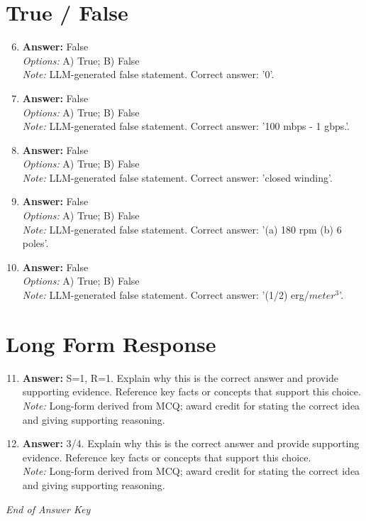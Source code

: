 \documentclass[12pt]{article}
\begin{document}
\section*{True / False}
\begin{enumerate}[label=\arabic*.]
\setcounter{enumi}{5}
\item \textbf{Answer:} False
\\ \textit{Options:} A) True; B) False
\\ \textit{Note:} LLM-generated false statement. Correct answer: '0'.
\item \textbf{Answer:} False
\\ \textit{Options:} A) True; B) False
\\ \textit{Note:} LLM-generated false statement. Correct answer: '100 mbps - 1 gbps.'.
\item \textbf{Answer:} False
\\ \textit{Options:} A) True; B) False
\\ \textit{Note:} LLM-generated false statement. Correct answer: 'closed winding'.
\item \textbf{Answer:} False
\\ \textit{Options:} A) True; B) False
\\ \textit{Note:} LLM-generated false statement. Correct answer: '(a) 180 rpm (b) 6 poles'.
\item \textbf{Answer:} False
\\ \textit{Options:} A) True; B) False
\\ \textit{Note:} LLM-generated false statement. Correct answer: '(1/2) erg/$meter^3$'.
\end{enumerate}

\section*{Long Form Response}
\begin{enumerate}[label=\arabic*.]
\setcounter{enumi}{10}
\item \textbf{Answer:} S=1, R=1. Explain why this is the correct answer and provide supporting evidence. Reference key facts or concepts that support this choice.
\\ \textit{Note:} Long-form derived from MCQ; award credit for stating the correct idea and giving supporting reasoning.
\item \textbf{Answer:} 3/4. Explain why this is the correct answer and provide supporting evidence. Reference key facts or concepts that support this choice.
\\ \textit{Note:} Long-form derived from MCQ; award credit for stating the correct idea and giving supporting reasoning.
\end{enumerate}

\vfill
\noindent\textit{End of Answer Key}
\end{document}
